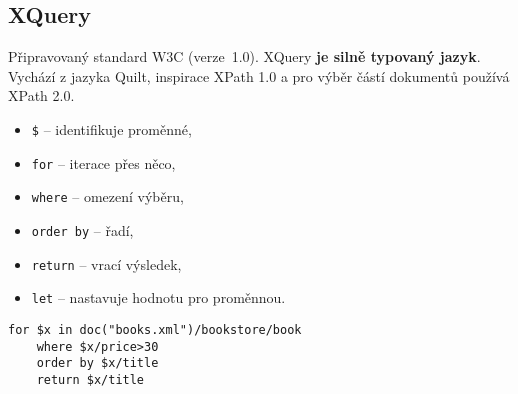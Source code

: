 \subsection{XQuery}
Připravovaný standard W3C (verze 1.0). XQuery \textbf{je silně typovaný jazyk}. Vychází z jazyka Quilt, inspirace XPath 1.0 a pro výběr částí dokumentů používá XPath 2.0.
\bigskip\\
\begin{minipage}[t]{0.5\textwidth}
  \begin{itemize}
    \item \texttt{\$} -- identifikuje proměnné,
    \item \texttt{for} -- iterace přes něco,
    \item \texttt{where} -- omezení výběru,
    \item \texttt{order by} -- řadí,
    \item \texttt{return} -- vrací výsledek,
    \item \texttt{let} -- nastavuje hodnotu pro proměnnou.
  \end{itemize}
\end{minipage}
\begin{minipage}[t]{0.5\textwidth}
  \begin{verbatim}
for $x in doc("books.xml")/bookstore/book
	where $x/price>30
	order by $x/title
	return $x/title
	\end{verbatim}
\end{minipage}

